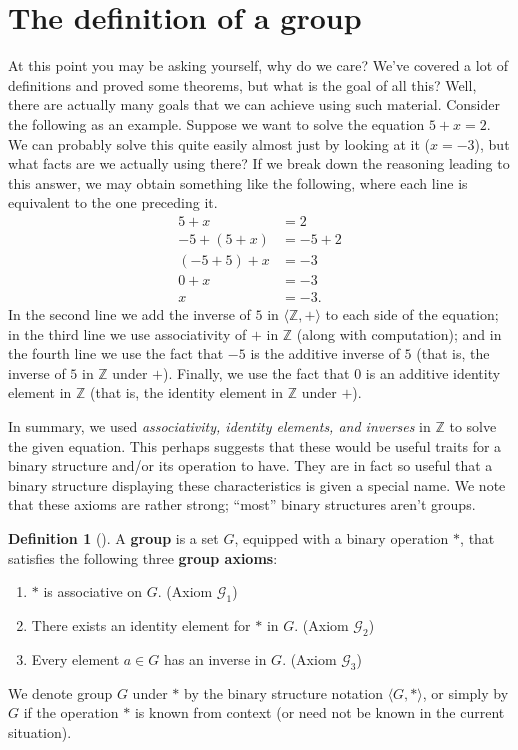 \documentclass[10pt,]{book}
\newcommand{\terminology}[1]{\textbf{#1}}
\theoremstyle{plain}
\theoremstyle{definition}
\newtheorem{definition}[theorem]{Definition}
\theoremstyle{definition}
\theoremstyle{definition}
\theoremstyle{definition}
\numberwithin{equation}{section}
\def\Z{\mathbb{Z}}
\def\G{\mathcal{G}}
\newcommand{\amp}{&}
\begin{document}
\section[{The definition of a group}]{The definition of a group}\label{gpdef}
At this point you may be asking yourself, why do we care? We've covered a lot of definitions and proved some theorems, but what is the goal of all this? Well, there are actually many goals that we can achieve using such material. Consider the following as an example. Suppose we want to solve the equation \(5+x=2\). We can probably solve this quite easily almost just by looking at it (\(x=-3\)), but what facts are we actually using there? If we break down the reasoning leading to this answer, we may obtain something like the following, where each line is equivalent to the one preceding it.%
\begin{align*}
5+x\amp =2 \\
-5+(5+x)\amp =-5+2\\
(-5+5)+x \amp =-3\\
0+x\amp =-3\\
x\amp =-3.
\end{align*}
In the second line we add the inverse of \(5\) in \(\langle \Z, +\rangle\) to each side of the equation; in the third line we use associativity of \(+\) in \(\Z\) (along with computation); and in the fourth line we use the fact that \(-5\) is the additive inverse of \(5\) (that is, the inverse of \(5\) in \(\Z\) under \(+\)). Finally, we use the fact that 0 is an additive identity element in \(\Z\) (that is, the identity element in \(\Z\) under \(+\)).%
\par
In summary, we used \emph{associativity, identity elements, and inverses} in \(\Z\) to solve the given equation. This perhaps suggests that these would be useful traits for a binary structure and/or its operation to have. They are in fact so useful that a binary structure displaying these characteristics is given a special name. We note that these axioms are rather strong; ``most'' binary structures aren't groups.%
\begin{definition}[{}]\label{definition-20}
A \terminology{group} is a set \(G\), equipped with a binary operation \(*\), that satisfies the following three \terminology{group axioms}: \leavevmode%
\begin{enumerate}[label=\Roman*]
\item\hypertarget{li-74}{}\(*\) is associative on \(G\). (Axiom \(\G_1\))%
\item\hypertarget{li-75}{}There exists an identity element for \(*\) in \(G\). (Axiom \(\G_2\))%
\item\hypertarget{li-76}{}Every element \(a\in G\) has an inverse in \(G\). (Axiom \(\G_3\))%
\end{enumerate}
%
\par
We denote group \(G\) under \(*\) by the binary structure notation \(\langle G,*\rangle\), or simply by \(G\) if the operation \(*\) is known from context (or need not be known in the current situation).%
\end{definition}
\end{document}
